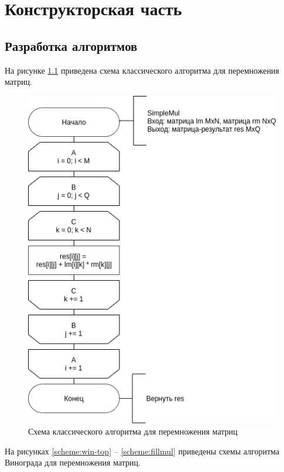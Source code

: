 \chapter{Конструкторская часть}

\section{Разработка алгоритмов}
На рисунке \ref{scheme:simple} приведена схема классического алгоритма для перемножения матриц.

\begin{figure}[!htb]
	\centering
	\includegraphics[scale=0.65]{schemes/simple}
	\caption{Схема классического алгоритма для перемножения матриц}
	\label{scheme:simple}
\end{figure}

На рисунках \ref{scheme:win-top} -- \ref{scheme:fillmul} приведены схемы алгоритма Винограда для перемножения матриц.

